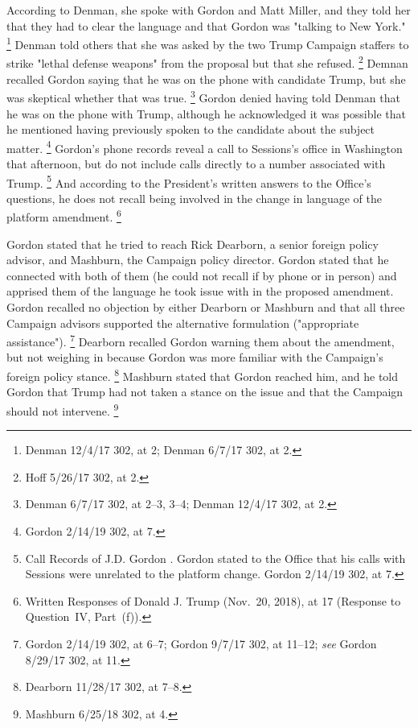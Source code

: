 According to Denman, she spoke with Gordon and Matt Miller, and they told her that they had to clear the language and that Gordon was "talking to New York."%
\footnote{Denman 12/4/17 302, at 2;
Denman 6/7/17 302, at 2.}
Denman told others that she was asked by the two Trump Campaign staffers to strike "lethal defense weapons" from the proposal but that she refused.%
\footnote{Hoff 5/26/17 302, at 2.}
Demnan recalled Gordon saying that he was on the phone with candidate Trump, but she was skeptical whether that was true.%
\footnote{Denman 6/7/17 302, at 2--3, 3--4;
Denman 12/4/17 302, at 2.}
Gordon denied having told Denman that he was on the phone with Trump, although he acknowledged it was possible that he mentioned having previously spoken to the candidate about the subject matter.%
\footnote{Gordon 2/14/19 302, at 7.}
Gordon's phone records reveal a call to Sessions's office in Washington that afternoon, but do not include calls directly to a number associated with Trump.%
\footnote{Call Records of J.D. Gordon .
Gordon stated to the Office that his calls with Sessions were unrelated to the platform change. Gordon 2/14/19 302, at 7.}
And according to the President's written answers to the Office's questions, he does not recall being involved in the change in language of the platform amendment.%
\footnote{Written Responses of Donald J. Trump (Nov.~20, 2018), at 17 (Response to Question~IV, Part~(f)).}

Gordon stated that he tried to reach Rick Dearborn, a senior foreign policy advisor, and Mashburn, the Campaign policy director.
Gordon stated that he connected with both of them (he could not recall if by phone or in person) and apprised them of the language he took issue with in the proposed amendment.
Gordon recalled no objection by either Dearborn or Mashburn and that all three Campaign advisors supported the alternative formulation ("appropriate assistance").%
\footnote{Gordon 2/14/19 302, at 6--7;
Gordon 9/7/17 302, at 11--12;
\textit{see} Gordon 8/29/17 302, at 11.}
Dearborn recalled Gordon warning them about the amendment, but not weighing in because Gordon was more familiar with the Campaign's foreign policy stance.%
\footnote{Dearborn 11/28/17 302, at 7--8.}
Mashburn stated that Gordon reached him, and he told Gordon that Trump had not taken a stance on the issue and that the Campaign should not intervene.%
\footnote{Mashburn 6/25/18 302, at 4.}

